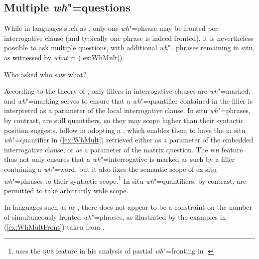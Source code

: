 \documentclass[output=paper
,notxmath 
	        ,collection
	        ,collectionchapter
 	        ,biblatex
                ,babelshorthands
                ,newtxmath
                ,draftmode
                ,colorlinks, citecolor=brown
]{langscibook}
\begin{document}
\subsection{Multiple \emph{wh}"=questions}


While in languages such as , only one \emph{wh}"=phrase may be
fronted per interrogative clause (and typically one phrase is indeed
fronted), it is nevertheless possible to ask multiple questions, with
additional \emph{wh}"=phrases remaining in situ, as witnessed by
\textit{what} in (\ref{ex:WhMult}).

\begin{exe}
  \ex Who asked who saw what? \label{ex:WhMult}
\end{exe}

\noindent
According to the theory of \citet{Ginzburg:Sag:01}, only fillers in
interrogative clauses are \emph{wh}"=marked, and \emph{wh}"=marking
serves to ensure that a \emph{wh}"=quantifier contained in the filler
is interpreted as a parameter of the local interrogative clause. In
situ \emph{wh}"=phrases, by contrast, are still quantifiers, so they
may scope higher than their syntactic position suggests.
\citet[Section~5.3]{Ginzburg:Sag:01} follow \citet[Section~8.2]{Pollard:Sag:94} in adopting a
, which enables them to have the in situ
\emph{wh}"=quantifier in (\ref{ex:WhMult}) retrieved either as a
parameter of the embedded interrogative clause, or as a parameter of
the matrix question. The \textsc{wh} feature thus not only ensures
that a \emph{wh}"=interrogative is marked as such by a filler
containing a \emph{wh}"=word, but it also fixes the semantic scope of
ex-situ \emph{wh}"=phrases to their syntactic
scope.\footnote{\citet{kathol:scope-marking} uses the \textsc{que}
  feature in his analysis of partial \emph{wh}"=fronting in . }
In situ \emph{wh}"=quantifiers, by contrast, are permitted to take
arbitrarily wide scope.

\begin{sloppypar}
In  languages such as  or  \citep{Penn:99},
there does not appear to be a constraint on the number of
simultaneously fronted \emph{wh}"=phrases, as illustrated by the
examples in (\ref{ex:WhMultFront}) taken from .
\end{sloppypar}

\eal
\label{ex:WhMultFront}
\zl
\end{document}
